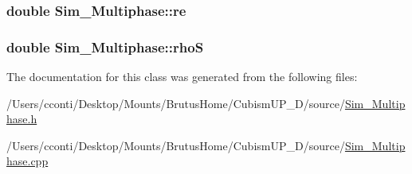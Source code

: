\subsubsection[{re}]{\setlength{\rightskip}{0pt plus 5cm}double Sim\+\_\+\+Multiphase\+::re\hspace{0.3cm}{\ttfamily [protected]}}\label{class_sim___multiphase_ab75819bd31153d20f56ae0ccfdb6145f}
\hypertarget{class_sim___multiphase_a898c62fc2266a25d9bc02d238b313989}{}
\subsubsection[{rho\+S}]{\setlength{\rightskip}{0pt plus 5cm}double Sim\+\_\+\+Multiphase\+::rho\+S\hspace{0.3cm}{\ttfamily [protected]}}\label{class_sim___multiphase_a898c62fc2266a25d9bc02d238b313989}


The documentation for this class was generated from the following files\+:\begin{DoxyCompactItemize}
\item 
/\+Users/cconti/\+Desktop/\+Mounts/\+Brutus\+Home/\+Cubism\+U\+P\+\_\+D/source/\hyperlink{_sim___multiphase_8h}{Sim\+\_\+\+Multiphase.\+h}\item 
/\+Users/cconti/\+Desktop/\+Mounts/\+Brutus\+Home/\+Cubism\+U\+P\+\_\+D/source/\hyperlink{_sim___multiphase_8cpp}{Sim\+\_\+\+Multiphase.\+cpp}\end{DoxyCompactItemize}
